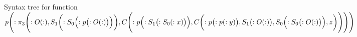 \documentclass{article}
\begin{document}
\begin{figure}
  \centering
{}

  \caption{Syntax tree for function $
  p \Biggl(: 
    \pi_3\Biggl(: 
      O(:), 
      S_1\biggl(:
        S_0\Bigl(: 
          p\bigl(: 
            O(:)
          \bigr)
        \Bigr)
      \biggr),
      C \Biggl(:
        p \Bigl(:
          S_1 \bigl(:
            S_0(: x)
          \bigr)
        \Bigr),
        C\biggl(:
          p\bigl(:
            p(:y)
          \bigr),
          S_1 \bigl(:
            O(:)
          \bigr),
          S_0\Bigl(:
            S_0 \bigl(:
              O(:)
            \bigr)
          \Bigr),
          z
        \biggr)
      \Biggr)
    \Biggr)
  \Biggr)
$}
\end{figure}
\end{document}
